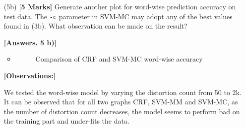 \documentclass[11pt]{report}
\begin{document}
\begin{itemize}
		{\bf [Observations:]}
	
	We tested the char-wise model by varying the distortion count from 50 to 2k. It can be observed that for all two graphs CRF, SVM-MM and SVM-MC, as the number of distortion count decreases, the model seems to perform bad on the training part and under-fits the data.
	
	
	\item[(5b)] {\bf [5 Marks]}  Generate another plot for word-wise prediction accuracy on test data.  The \verb#-c# parameter in SVM-MC may adopt any of the best values found in (3b).
	What observation can be made on the result?
	
	{\bf [Answers. 5 b)]} 
	\begin{itemize}
	    \item 
	    	\begin{figure}[H]
            	\centering
                \caption{Comparison of CRF and SVM-MC word-wise accuracy}
            	\label{fig:compare_optimizer}
            \end{figure}
	\end{itemize}
    
    	
	{\bf [Observations:]}
	
	We tested the word-wise model by varying the distortion count from 50 to 2k. It can be observed that for all two graphs CRF, SVM-MM and SVM-MC, as the number of distortion count decreases, the model seems to perform bad on the training part and under-fits the data.
	
	
\end{itemize}
\end{document}
